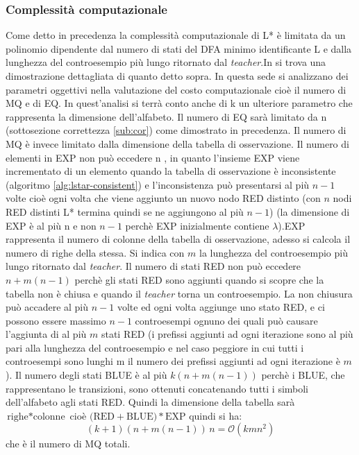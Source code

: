 \subsubsection{Complessità computazionale}Come detto in precedenza la complessità computazionale di L* è limitata da un polinomio dipendente dal numero di stati del DFA minimo identificante \ac{L} e dalla lunghezza del controesempio più lungo ritornato dal \textit{teacher}.In \cite{Angluin87} si trova una dimostrazione dettagliata di quanto detto sopra. In questa sede si analizzano dei parametri oggettivi nella valutazione del costo computazionale cioè il numero di \ac{MQ} e di \ac{EQ}. In quest'analisi si terrà conto anche di k un ulteriore parametro che rappresenta la dimensione dell'alfabeto. Il numero di \ac{EQ} sarà limitato da n (sottosezione correttezza \ref{sub:cor}) come dimostrato in precedenza. Il numero di \ac{MQ} è invece limitato dalla dimensione della tabella di osservazione. Il numero di elementi in EXP non può eccedere n , in quanto l'insieme EXP viene incrementato di un elemento quando la tabella di osservazione è inconsistente (algoritmo \ref{alg:lstar-consistent}) e l'inconsistenza può presentarsi al più $n-1$ volte cioè ogni volta che viene aggiunto un nuovo nodo RED distinto (con $n$ nodi RED distinti L* termina quindi se ne aggiungono al più $n-1$) (la dimensione di EXP è al più n e non $n-1$ perchè EXP inizialmente contiene $\lambda$).EXP rappresenta il numero di colonne della tabella di osservazione, adesso si calcola il numero di righe della stessa. Si indica con $m$ la lunghezza del controesempio più lungo ritornato dal \textit{teacher}. Il numero di stati RED non può eccedere $n+m(n-1)$  perchè gli stati RED sono aggiunti quando si scopre che la tabella non è chiusa e quando il \textit{teacher} torna un controesempio.  La non chiusura può accadere al più $n-1$ volte ed ogni volta aggiunge uno stato RED, e ci possono essere massimo $n-1$ controesempi ognuno dei quali può causare l'aggiunta di al più $m$ stati RED (i prefissi aggiunti ad ogni iterazione sono al più pari alla lunghezza del controesempio e nel caso peggiore in cui tutti i controesempi sono lunghi m il numero dei prefissi aggiunti ad ogni iterazione è $m$). Il numero degli stati BLUE è al più $k(n+m(n-1))$ perchè i BLUE, che rappresentano le transizioni, sono ottenuti concatenando tutti i simboli dell'alfabeto agli stati RED. Quindi la dimensione della tabella sarà $\text{righe} * \text{colonne}$ cioè $\text{(RED}+\text{BLUE)}*\text{EXP}$ quindi si ha:
\begin{equation*}
(k+1)(n+m(n-1))\,n = \mathcal{O}(kmn^{2})
\end{equation*}
che è il numero di \ac{MQ} totali.
